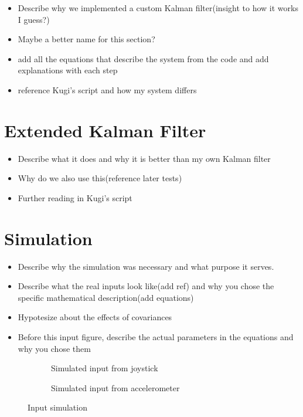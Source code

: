 \begin{itemize}
 \item Describe why we implemented a custom Kalman filter(insight to how it works I guess?)
 \item Maybe a better name for this section?
 \item add all the equations that describe the system from the code and add explanations with each step
 \item reference Kugi's script and how my system differs
\end{itemize}

\section{Extended Kalman Filter}\label{sec:extended_kalman}

\begin{itemize}
 \item Describe what it does and why it is better than my own Kalman filter
 \item Why do we also use this(reference later tests)
 \item Further reading in Kugi's script
\end{itemize}

\section{Simulation}\label{sec:sim}

\begin{itemize}
 \item Describe why the simulation was necessary and what purpose it serves.
 \item Describe what the real inputs look like(add ref) and why you chose the specific mathematical description(add equations)
 \item Hypotesize about the effects of covariances
\end{itemize}
\hrulefill
\begin{itemize}
 \item Before this input figure, describe the actual parameters in the equations and why you chose them
\end{itemize}

\begin{figure}[h]
 \begin{subfigure}[b]{0.45\textwidth}
  \label{InputVelSim}
  \caption{Simulated input from joystick}
 \end{subfigure}
 \hfill
 \begin{subfigure}[b]{0.45\textwidth}
  \label{InputAccelSim}
  \caption{Simulated input from accelerometer}
 \end{subfigure}
 \caption{Input simulation}
\end{figure}

